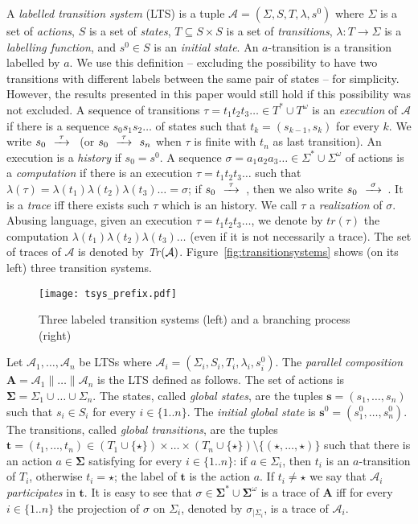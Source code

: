 \documentclass{llncs}
\def\A{\mathcal{A}}
\def\ns{\star}
\def\prod{\mathbf{A}}
\def\t{\mathbf{t}}
\def\s{\mathbf{s}}
\newcommand{\Tr}[1]{{\it Tr}(#1)}
\def\trace{tr}
\def\by#1{\mathop{{\hbox{\setbox0=\hbox{$\scriptstyle{#1\quad}$}{$\buildrel{\quad\scriptstyle{#1}\quad}\over{\hbox to \wd0{\rightarrowfill}}$}}}}}
\begin{document}
A \emph{labelled transition system} (LTS) is a tuple $\A=(\Sigma,S,T,\lambda,s^0)$ where $\Sigma$ 
is a set of \emph{actions}, $S$ is a set of \emph{states}, 
$T \subseteq S \times S$ is a set of \emph{transitions}, $\lambda \colon T \rightarrow \Sigma$
is a {\em labelling function}, and $s^0\in S$ is an \emph{initial state}. 
An $a$-transition
is a transition labelled by $a$. 
We use this definition -- excluding the possibility to have two transitions with different labels between the same pair of states -- for simplicity. 
However, the results presented in this paper would still hold if this possibility was not excluded.
A sequence of transitions $\tau = t_1t_2t_3\dots \in T^*\cup T^\omega$ is an \emph{execution} of $\A$ if there
is a sequence $s_0s_1s_2\dots$ of states such that $t_k=(s_{k-1},s_k)$ 
for every $k$. We write $s_0 \by{\tau}$ (or $s_0\by{\tau} s_n$ when $\tau$ is finite with $t_n$ as last transition). An execution 
is a \emph{history} if $s_0=s^0$. 
A sequence $\sigma=a_1a_2a_3 \ldots \in\Sigma^*\cup\Sigma^\omega$ 
of actions is a \emph{computation} if there is an execution $\tau = t_1t_2t_3\dots$
such that $\lambda(\tau)=\lambda(t_1)\lambda(t_2)\lambda(t_3)\ldots = \sigma$; if $s_0 \by{\tau}$, 
then we also write $s_0 \by{\sigma}$. 
It is a \emph{trace} if{}f there exists such $\tau$ which is an history.
We call $\tau$ a \emph{realization} of $\sigma$.
Abusing language, given an execution $\tau=t_1t_2t_3 \ldots $, we denote by $\trace(\tau)$ the 
computation $\lambda(t_1)\lambda(t_2)\lambda(t_3) \ldots$ (even if it is not necessarily a trace).
The set of traces 
of $\A$ is denoted by $\Tr{\A}$.
Figure~\ref{fig:transitionsystems} shows (on its left) three transition systems. 

\begin{figure}[htbp]
\centering
\texttt{[image: tsys\_prefix.pdf]}
\caption{Three labeled transition systems (left) and a branching process (right)}\label{fig:transitionsystems}\label{fig:petrinet}\label{fig:unfolding}
\end{figure}


Let $\A_1,\dots,\A_n$ be LTSs where $\A_i=(\Sigma_i,S_i,T_i,\lambda_i,s^0_i)$. 
The {\em parallel composition}  $\prod=\A_1 \parallel \ldots \parallel \A_n$ is the LTS 
defined as follows. The set of actions
is $\mathbf{\Sigma} =\Sigma_1 \cup \ldots \cup \Sigma_n$. The states, called \emph{global states}, are the tuples  
$\s=(s_1,\dots,s_n)$ such that $s_i\in S_i$ for every $i\in\{1..n\}$. 
The \emph{initial global state} is $\s^0=(s_1^0,\dots,s_n^0)$. The transitions, called {\em global transitions},
are the tuples $\t=(t_1, \ldots, t_n)  \in (T_1\cup\{\ns\})\times\dots\times(T_n\cup\{\ns\})\setminus\{(\ns,\dots,\ns)\}$ such that there is an action $a \in \mathbf{\Sigma}$ satisfying 
 for every $i\in\{1..n\}$: if $a \in \Sigma_i$, then $t_i$ is an $a$-transition of $T_i$,
otherwise $t_i = \ns$; the label of $\t$ is the action $a$. 
If $t_i\neq\ns$ we say that $\A_i$ \emph{participates} in $\t$. 
It is easy to see that $\sigma \in \mathbf{\Sigma}^*\cup\mathbf{\Sigma}^\omega$ is a trace of $\prod$ if{}f for every $i \in \{1..n\}$ the projection of $\sigma$ on $\Sigma_i$, denoted by $\sigma_{|\Sigma_i}$, is a trace of $\A_i$.
\end{document}

